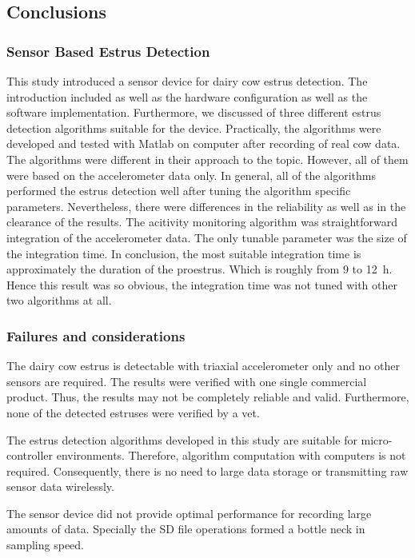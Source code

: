 \documentclass[english,12pt,a4paper,pdftex,elec,utf8]{aaltothesis}
\begin{document}
\subsection{Conclusions} \label{conclusionssection}

\subsubsection{Sensor Based Estrus Detection}

This study introduced a sensor device for dairy cow estrus detection. The introduction included as well as the hardware configuration as well as the software implementation. Furthermore, we discussed of three different estrus detection algorithms suitable for the device. Practically, the algorithms were developed and tested with Matlab on computer after recording of real cow data. The algorithms were different in their approach to the topic. However, all of them were based on the accelerometer data only. In general, all of the algorithms performed the estrus detection well after tuning the algorithm specific parameters. Nevertheless, there were differences in the reliability as well as in the clearance of the results. The acitivity monitoring algorithm was straightforward integration of the accelerometer data. The only tunable parameter was the size of the integration time. In conclusion, the most suitable integration time is approximately the duration of the proestrus. Which is roughly from 9 to \SI{12}{\hour}. Hence this result was so obvious, the integration time was not tuned with other two algorithms at all.



\subsubsection{Failures and considerations}

The dairy cow estrus is detectable with triaxial accelerometer only and no other sensors are required. The results were verified with one single commercial product. Thus, the results may not be completely reliable and valid. Furthermore, none of the detected estruses were verified by a vet.

The estrus detection algorithms developed in this study are suitable for micro-controller environments. Therefore, algorithm computation with computers is not required. Consequently, there is no need to large data storage or transmitting raw sensor data wirelessly.

The sensor device did not provide optimal performance for recording large amounts of data. Specially the SD file operations formed a bottle neck in sampling speed.
\end{document}

